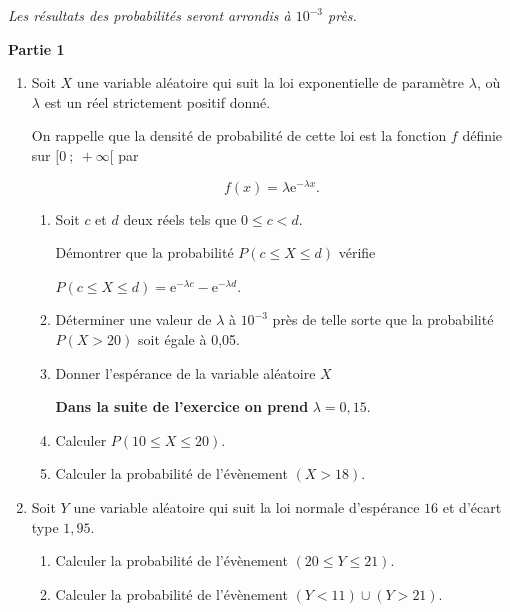 \documentclass[12pt,french]{article}
\begin{document}
\begin{question}[subtitle={Métropole 2015}]
\emph{Les résultats des probabilités seront arrondis à $10^{-3}$ près.}

\bigskip

\textbf{Partie 1}

\medskip

\begin{enumerate}
\item Soit $X$ une variable aléatoire qui suit la loi exponentielle de paramètre $\lambda$, où $\lambda$ est un réel strictement positif donné.

On rappelle que la densité de probabilité de cette loi est la fonction $f$  définie sur
$[0~;~+ \infty[$ par %

\[f(x) = \lambda\text{e}^{- \lambda x}.\]

	\begin{enumerate}
		\item Soit $c$ et $d$ deux réels tels que $0 \leqslant c < d$.
		
Démontrer que la probabilité $P( c \leqslant X \leqslant d)$ vérifie 

$P(c \leqslant X \leqslant d) = \text{e}^{- \lambda c}   - \text{e}^{- \lambda d}$.
		\item Déterminer une valeur de $\lambda$ à $10^{-3}$ près de telle sorte que la probabilité $P(X > 20)$ soit égale à 0,05.
		\item Donner l'espérance de la variable aléatoire $X$

\medskip
		
\textbf{Dans la suite de l'exercice on prend } \boldmath$\lambda = 0,15$\unboldmath.
		\item Calculer $P(10 \leqslant X \leqslant 20)$.
		\item Calculer la probabilité de l'évènement $(X > 18)$.
	\end{enumerate}
\item Soit $Y$ une variable aléatoire qui suit la loi normale d'espérance $16$ et d'écart type $1,95$.
	\begin{enumerate}
		\item Calculer la probabilité de l'évènement $(20 \leqslant Y \leqslant 21)$.
		\item Calculer la probabilité de l'évènement $(Y < 11) \cup (Y > 21)$.
	\end{enumerate}
\end{enumerate}

\bigskip
	

\end{question}
\end{document}
